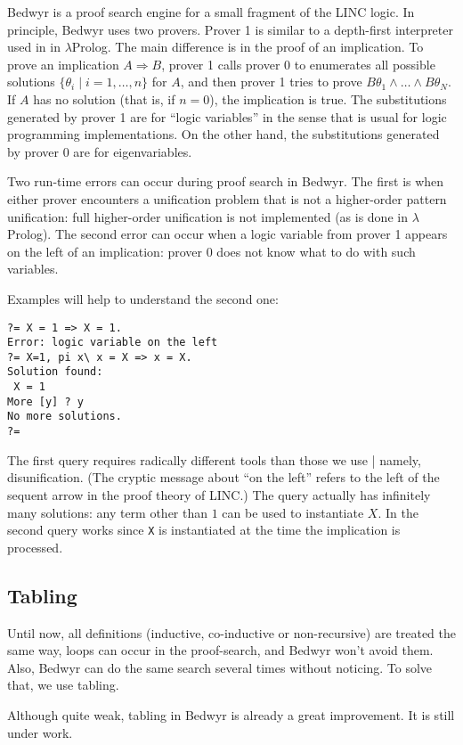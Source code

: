 \documentclass{article}
\begin{document}
Bedwyr is a proof search engine for a small fragment of the LINC
logic.  In principle, Bedwyr uses two provers.  Prover 1 is similar to
a depth-first interpreter used in in $\lambda$Prolog.  The main
difference is in the proof of an implication.  
To prove an implication $A\Rightarrow B$, prover 1  calls prover 0
to enumerates all possible solutions
$\{\theta_i\;|\;i=1,\ldots,n\}$ for $A$, 
and then prover 1 tries to prove $B\theta_1\wedge\dots\wedge B\theta_N$.
If $A$ has no solution (that is, if $n=0$), the implication is true.
The substitutions generated by prover 1 are for ``logic variables'' in
the sense that is usual for logic programming implementations.  On the
other hand, the substitutions generated by prover 0 are for
eigenvariables. 

Two run-time errors can occur during proof search in Bedwyr.  The first
is when either prover encounters a unification problem that is not a 
higher-order pattern unification: full higher-order unification is not
implemented (as is done in $\lambda$Prolog).  The second error can
occur when a logic variable from prover 1 appears on the left of an
implication: prover 0 does not know what to do with such variables.

Examples will help to understand the second one:
\begin{verbatim}
?= X = 1 => X = 1.
Error: logic variable on the left
?= X=1, pi x\ x = X => x = X.
Solution found:
 X = 1
More [y] ? y
No more solutions.
?= 
\end{verbatim}
The first query requires radically different tools than those we use |
namely, disunification. (The cryptic message about ``on the left''
refers to the left of the sequent arrow in the proof theory of LINC.)
The query actually has infinitely many solutions: any term other than
$1$ can be used to instantiate $X$.  In the second query works since
\verb.X. is instantiated at the time the implication is processed.

\subsection{Tabling}

Until now, all definitions (inductive, co-inductive or non-recursive)
are treated the same way, loops can occur in the proof-search, and Bedwyr
won't avoid them. Also, Bedwyr can do the same search several times without
noticing. To solve that, we use tabling.

Although quite weak, tabling in Bedwyr is already a great improvement.
It is still under work.
\end{document}

